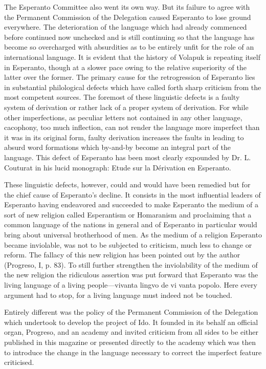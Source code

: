 The Esperanto Committee also went its own way. But its failure to agree with the Permanent Commission of the Delegation caused Esperanto to lose ground everywhere. The deterioration of the language which had already commenced before continued now unchecked and is still continuing so that the language has become so overcharged with absurdities as to be entirely unfit for the role of an international language. 
It is evident that the history of Volapuk is repeating itself in Esperanto, though at a slower pace owing to the relative superiority of the latter over the former. The primary cause for the retrogression of Esperanto lies in substantial philological defects which have called forth sharp criticism from the most competent sources. The foremost of these linguistic defects is a faulty system of derivation or rather lack of a proper system of derivation. For while other imperfections, as peculiar letters not contained in any other language, cacophony, too much inflection, can not render the language more imperfect than it was in its original form, faulty derivation increases the faults in leading to absurd word formations which by-and-by become an integral part of the language. This defect of Esperanto has been most clearly expounded by Dr. L. Couturat in his lucid monograph: Etude sur la Dérivation en Esperanto. 

These linguistic defects, however, could and would have been remedied but for the chief cause of Esperanto’s decline. It consists in the most influential leaders of Esperanto having endeavored and succeeded to make Esperanto the medium of a sort of new religion called Esperantism or Homaranism and proclaiming that a common language of the nations in general and of Esperanto in particular would bring about universal brotherhood of men. As the medium of a religion Esperanto became inviolable, was not to be subjected to criticism, much less to change or reform. The fallacy of this new religion has been pointed out by the author (Progreso, I, p. 83). To still further strengthen the inviolability of the medium of the new religion the ridiculous assertion was put forward that Esperanto was the living language of a living people—vivanta lingvo de vi vanta popolo. Here every argument had to stop, for a living language must indeed not be touched. 

Entirely different was the policy of the Permanent Commission of the Delegation which undertook to develop the project of Ido. It founded in its behalf an official organ, Progreso, and an academy and invited criticism from all sides to be either published in this magazine or presented directly to the academy which was then to introduce the change in the language necessary to correct the imperfect feature criticised. 

